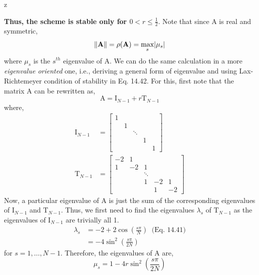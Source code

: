 z\documentclass[a4paper,12pt,twoside]{book}
\newcommand{\nll}[0]{\newline\newline}
\DeclarePairedDelimiter\abs{\lvert}{\rvert}
\newcommand{\mat}[1]{\bm{\mathrm{#1}}}
\newcommand{\norm}[1]{\Vert #1 \Vert}
\begin{document}
\textbf{Thus, the scheme is stable only for $0<r\le \frac{1}{2}$}. Note that since $\mat{A}$ is real and symmetric,
\[\norm{\mat{A}} = \rho(\mat{A}) = \underset{s}{\max} \abs{\mu_s}\]
where $\mu_s$ is the $s^{th}$ eigenvalue of $\mat{A}$.
\nll
We can do the same calculation in a more\textit{ eigenvalue oriented }one, i.e., deriving a general form of eigenvalue and using Lax-Richtemeyer condition of stability in Eq. 14.42.
\nll
For this, first note that the matrix $\mat{A}$ can be rewritten as,
\[\mat{A} = \mat{I}_{N-1} + r\mat{T}_{N-1}\]
where,
\begin{equation}
\begin{split}
   \mat{I}_{N-1} &= \begin{bmatrix}
            1 &  &  &  &  \\
             & 1 &  &  &  \\
             & & \ddots  &  &  \\
             &  &  & 1 &  \\
              &  &  &  & 1 
        \end{bmatrix}\\
    \mat{T}_{N-1} &= \begin{bmatrix}
            -2 & 1 &  &  &  \\
            1 & -2 & 1 &  &  \\
              &  & \ddots  &  &  \\
             &  & 1 & -2 & 1 \\
              &  &  & 1 & -2
        \end{bmatrix}
\end{split}
\end{equation}
Now, a particular eigenvalue of $\mat{A}$ is just the sum of the corresponding eigenvalues of $\mat{I}_{N-1}$ and $\mat{T}_{N-1}$. Thus, we first need to find the eigenvalues $\lambda_s$ of $\mat{T}_{N-1}$ as the eigenvalues of $\mat{I}_{N-1}$ are trivially all 1.
\begin{equation*}
    \begin{split}
    \lambda_s &= -2 + 2\cos\left( \frac{s\pi}{N} \right) \;\;\text{(Eq. 14.41)}\\
    &= -4\sin^2\left(\frac{s\pi}{2N}\right)
    \end{split}
\end{equation*}
for $s = 1,\dots,N-1$. Therefore, the eigenvalues of $\mat{A}$ are,
\begin{equation}
    \mu_s = 1-4r\sin^2\left(\frac{s\pi}{2N}\right)
\end{equation}
\end{document}
